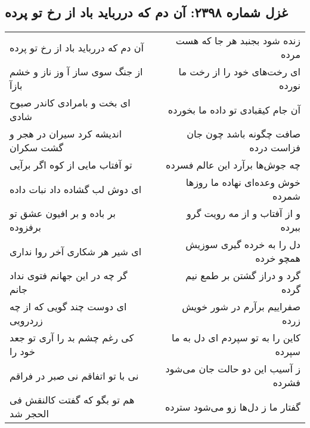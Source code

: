 \begin{center}
\section*{غزل شماره ۲۳۹۸: آن دم که دررباید باد از رخ تو پرده}
\label{sec:2398}
\begin{longtable}{l p{0.5cm} r}
آن دم که دررباید باد از رخ تو پرده
&&
زنده شود بجنبد هر جا که هست مرده
\\
از جنگ سوی ساز آ وز ناز و خشم بازآ
&&
ای رخت‌های خود را از رخت ما نورده
\\
ای بخت و بامرادی کاندر صبوح شادی
&&
آن جام کیقبادی تو داده ما بخورده
\\
اندیشه کرد سیران در هجر و گشت سکران
&&
صافت چگونه باشد چون جان فزاست درده
\\
تو آفتاب مایی از کوه اگر برآیی
&&
چه جوش‌ها برآرد این عالم فسرده
\\
ای دوش لب گشاده داد نبات داده
&&
خوش وعده‌ای نهاده ما روزها شمرده
\\
بر باده و بر افیون عشق تو برفزوده
&&
و از آفتاب و از مه رویت گرو ببرده
\\
ای شیر هر شکاری آخر روا نداری
&&
دل را به خرده گیری سوزیش همچو خرده
\\
گر چه در این جهانم فتوی نداد جانم
&&
گرد و دراز گشتن بر طمع نیم گرده
\\
ای دوست چند گویی که از چه زردرویی
&&
صفراییم برآرم در شور خویش زرده
\\
کی رغم چشم بد را آری تو جعد خود را
&&
کاین را به تو سپردم ای دل به ما سپرده
\\
نی با تو اتفاقم نی صبر در فراقم
&&
ز آسیب این دو حالت جان می‌شود فشرده
\\
هم تو بگو که گفتت کالنقش فی الحجر شد
&&
گفتار ما ز دل‌ها زو می‌شود سترده
\\
\end{longtable}
\end{center}
